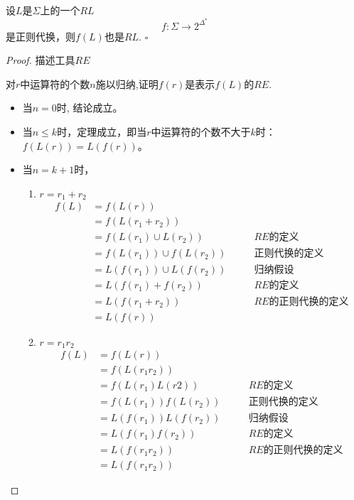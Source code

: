 \begin{theorem}
	设$L$是$\Sigma$上的一个$RL$
	$$f:\Sigma \to 2^{\Delta^{\ast}}$$
	是正则代换，则$f(L)$也是$RL$. \hfill$\square$ 
\end{theorem}
\begin{proof}
	描述工具$RE$
	
	对$r$中运算符的个数$n$施以归纳,证明$f(r)$是表示$f(L)$的$RE$.
	\begin{itemize}
		\item 当$n=0$时, 结论成立。
		\item 当$n\le k$时，定理成立，即当$r$中运算符的个数不大于$k$时：$f(L(r)) = L(f(r))$。
		\item 当$n=k+1$时，
		\begin{enumerate}
			\item $r=r_1 + r_2$
			\begin{align*}
			f(L) &= f(L(r)) \\
			&=f(L(r_1 + r_2))\\
			&=f(L(r_1)\cup L(r_2))  &\qquad  \text{$RE$的定义} \\
			&=f(L(r_1))\cup f(L(r_2)) &\qquad \text{正则代换的定义} \\
			&=L(f(r_1))\cup L(f(r_2)) &\qquad \text{归纳假设} \\
			&=L(f(r_1)+f(r_2)) &\qquad RE\text{的定义} \\
			&=L(f(r_1+r_2)) &\qquad RE\text{的正则代换的定义} \\
			&=L(f(r))
			\end{align*}
			
			\item $r=r_1r_2$
			\begin{align*}
			f(L) &=f(L(r)) \\
			&=f(L(r_1r_2))\\
			&=f(L(r_1)L(r2)) &\qquad \text{$RE$的定义}\\
			&=f(L(r_1))f(L(r_2)) &\qquad \text{正则代换的定义}\\
			&=L(f(r_1))L(f(r_2)) &\qquad \text{归纳假设} \\
			&=L(f(r_1)f(r_2)) &\qquad \text{$RE$的定义}\\
			&=L(f(r_1r_2)) &\qquad \text{$RE$的正则代换的定义}\\
			&=L(f(r_1r_2))
			\end{align*}
			

\end{enumerate}
\end{itemize}
\end{proof}
